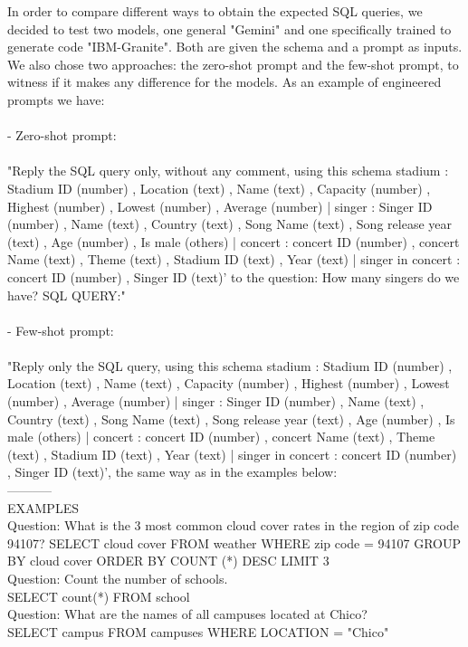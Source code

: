 \documentclass[12pt,a4paper]{article}
\begin{document}
In order to compare different ways to obtain the expected SQL queries, we decided to test two models, one general "Gemini" and one specifically trained to generate code "IBM-Granite". Both are given the schema and a prompt as inputs.
\\
We also chose two approaches: the zero-shot prompt and the few-shot prompt, to witness if it makes any difference for the models. As an example of engineered prompts we have:\\
\\
- Zero-shot prompt: \\
\\
"Reply the SQL query only, without any comment, using this schema stadium : Stadium ID (number) , Location (text) , Name (text) , Capacity (number) , Highest (number) , Lowest (number) , Average (number) | singer : Singer ID (number) , Name (text) , Country (text) , Song Name (text) , Song release year (text) , Age (number) , Is male (others) | concert : concert ID (number) , concert Name (text) , Theme (text) , Stadium ID (text) , Year (text) | singer in concert : concert ID (number) , Singer ID (text)' to the question: How many singers do we have?
SQL QUERY:"\\
\\
- Few-shot prompt: \\
\\
"Reply only the SQL query, using this schema stadium : Stadium ID (number) , Location (text) , Name (text) , Capacity (number) , Highest (number) , Lowest (number) , Average (number) | singer : Singer ID (number) , Name (text) , Country (text) , Song Name (text) , Song release year (text) , Age (number) , Is male (others) | concert : concert ID (number) , concert Name (text) , Theme (text) , Stadium ID (text) , Year (text) | singer in concert : concert ID (number) , Singer ID (text)', the same way as in the examples below:\\
-----------\\
EXAMPLES\\
Question: What is the 3 most common cloud cover rates in the region of zip code 94107?
SELECT cloud cover FROM weather WHERE zip code  =  94107 GROUP BY cloud cover ORDER BY COUNT (*) DESC LIMIT 3\\
Question: Count the number of schools.\\
 SELECT count(*) FROM school\\
Question: What are the names of all campuses located at Chico?\\
 SELECT campus FROM campuses WHERE LOCATION  =  "Chico"\\
\end{document}

